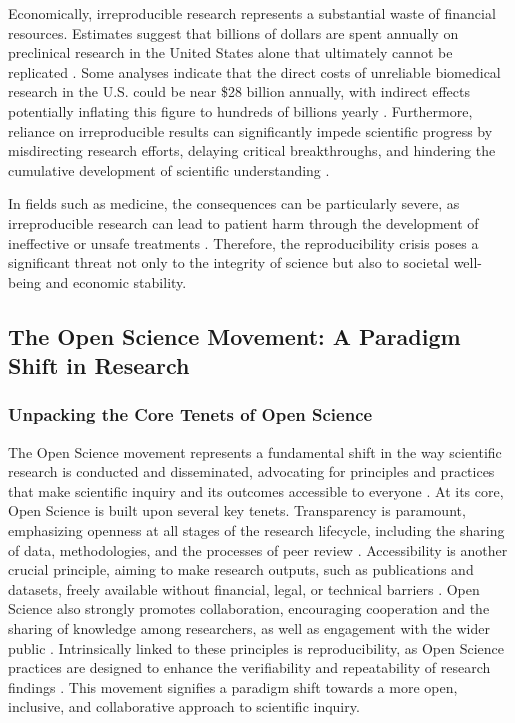 \documentclass{article}
\begin{document}
Economically, irreproducible research represents a substantial waste of financial resources. Estimates suggest that billions of dollars are spent annually on preclinical research in the United States alone that ultimately cannot be replicated \cite{freedman2015economics}. Some analyses indicate that the direct costs of unreliable biomedical research in the U.S. could be near \$28 billion annually, with indirect effects potentially inflating this figure to hundreds of billions yearly \cite{freedman2015economics}. Furthermore, reliance on irreproducible results can significantly impede scientific progress by misdirecting research efforts, delaying critical breakthroughs, and hindering the cumulative development of scientific understanding \cite{franco2014publication}.

In fields such as medicine, the consequences can be particularly severe, as irreproducible research can lead to patient harm through the development of ineffective or unsafe treatments \cite{begley2012drug}. Therefore, the reproducibility crisis poses a significant threat not only to the integrity of science but also to societal well-being and economic stability.


\subsection{The Open Science Movement: A Paradigm Shift in Research}

\subsubsection{Unpacking the Core Tenets of Open Science}

The Open Science movement represents a fundamental shift in the way scientific research is conducted and disseminated, advocating for principles and practices that make scientific inquiry and its outcomes accessible to everyone \cite{fecher2014open}. At its core, Open Science is built upon several key tenets. Transparency is paramount, emphasizing openness at all stages of the research lifecycle, including the sharing of data, methodologies, and the processes of peer review \cite{fecher2014open}. Accessibility is another crucial principle, aiming to make research outputs, such as publications and datasets, freely available without financial, legal, or technical barriers \cite{fecher2014open}. Open Science also strongly promotes collaboration, encouraging cooperation and the sharing of knowledge among researchers, as well as engagement with the wider public \cite{fecher2014open}. Intrinsically linked to these principles is reproducibility, as Open Science practices are designed to enhance the verifiability and repeatability of research findings \cite{simmons2011false}. This movement signifies a paradigm shift towards a more open, inclusive, and collaborative approach to scientific inquiry.
\end{document}
